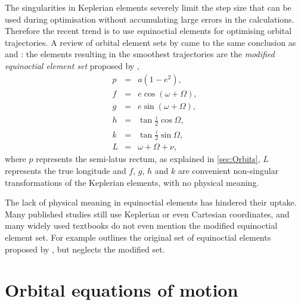The singularities in Keplerian elements severely limit the step size that can be used during optimisation without accumulating large errors in the calculations. Therefore the recent trend is to use equinoctial elements for optimising orbital trajectories. A review of orbital element sets by \textcite{Hintz2008} came to the same conclusion as \citeauthor{Letterio_thesis} and \citeauthor{Keppeler_thesis}: the elements resulting in the smoothest trajectories are the \emph{modified equinoctial element set} proposed by \textcite{Walker1985}, 
\begin{subequations}\label{eq:states}
\begin{eqnarray}
p & = & a(1-e^{2}) \label{eq:p},\\
f & = & e\cos(\omega+\Omega) \label{eq:f},\\
g & = & e\sin(\omega+\Omega) \label{eq:g},\\
h & = & \tan\frac{i}{2}\cos\Omega \label{eq:h},\\
k & = & \tan\frac{i}{2}\sin\Omega \label{eq:k},\\
L & = & \omega+\Omega+\nu \label{eq:L},
\end{eqnarray}
\end{subequations}
where $p$ represents the semi-latus rectum, as explained in \autoref{sec:Orbits}, $L$ represents the true longitude and $f$, $g$, $h$ and $k$ are convenient non-singular transformations of the Keplerian elements, with no physical meaning.

The lack of physical meaning in equinoctial elements has hindered their uptake. Many published studies still use Keplerian or even Cartesian coordinates, and many widely used textbooks do not even mention the modified equinoctial element set. For example \textcite[][p. 194]{Chobotov2002} outlines the original set of equinoctial elements proposed by \textcite{Broucke1972}, but neglects the modified set.





\section{Orbital equations of motion} \label{sec:Orbital-equations-of-motion}

